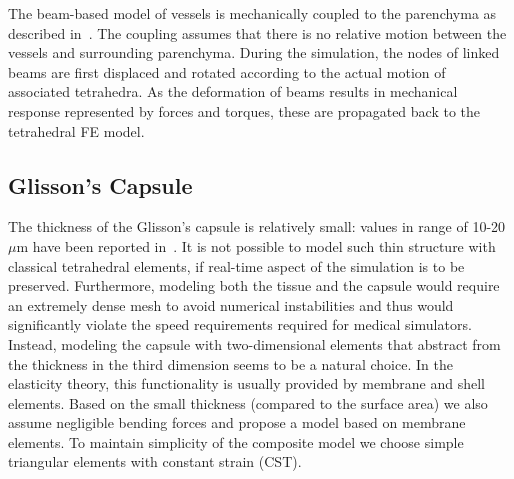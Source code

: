 \documentclass{llncs}
\begin{document}
The beam-based model of vessels is mechanically coupled to the parenchyma as described in~\cite{Peterlik2012}. 
The coupling assumes that there is no relative motion between the vessels and surrounding parenchyma. 
During the simulation, the nodes of linked beams are first displaced and rotated according to the actual motion of associated tetrahedra. 
As the deformation of beams results in mechanical response represented by forces and torques, these are propagated back to 
the tetrahedral FE model. 



\subsection{Glisson's Capsule} %
\label{ss:capsuleModel}
The thickness of the Glisson's capsule is relatively small: values in range of 10-20
$\mu$m have been reported in~\cite{Umale2011}.
It is not possible to model such thin structure with classical tetrahedral
elements, if real-time aspect of the simulation is to be preserved.
Furthermore, modeling both the tissue and the capsule would require an extremely 
dense mesh to avoid numerical instabilities and thus would significantly
violate the speed requirements required for medical simulators.
Instead, modeling the capsule with two-dimensional elements that abstract from the
thickness in the third dimension seems
to be a natural choice. In the elasticity theory, this functionality is usually provided by membrane and shell elements.
Based on the small thickness (compared to the surface area) we also
assume negligible bending forces and propose a model based on membrane
elements. 
To maintain simplicity of the composite model we choose simple triangular
elements with constant strain (CST).
\end{document}
